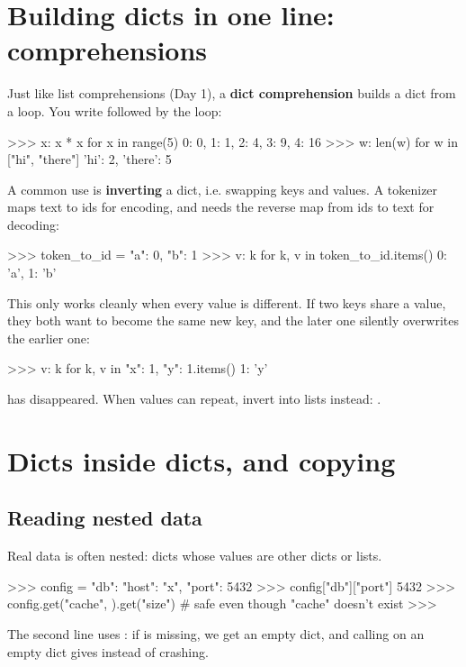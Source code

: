 \documentclass[10pt,a4paper]{article}
\begin{document}
\section{Building dicts in one line: comprehensions}
Just like list comprehensions (Day 1), a \textbf{dict comprehension} builds a dict from a loop. You write  followed by the loop:
\begin{txtcode}
>>> {x: x * x for x in range(5)}
{0: 0, 1: 1, 2: 4, 3: 9, 4: 16}
>>> {w: len(w) for w in ["hi", "there"]}
{'hi': 2, 'there': 5}
\end{txtcode}
A common use is \textbf{inverting} a dict, i.e. swapping keys and values. A tokenizer maps text to ids for encoding, and needs the reverse map from ids to text for decoding:
\begin{txtcode}
>>> token_to_id = {"a": 0, "b": 1}
>>> {v: k for k, v in token_to_id.items()}
{0: 'a', 1: 'b'}
\end{txtcode}
This only works cleanly when every value is different. If two keys share a value, they both want to become the same new key, and the later one silently overwrites the earlier one:
\begin{txtcode}
>>> {v: k for k, v in {"x": 1, "y": 1}.items()}
{1: 'y'}
\end{txtcode}
 has disappeared. When values can repeat, invert into lists instead: .
\setcounter{section}{6}
\section{Dicts inside dicts, and copying}
\subsection{Reading nested data}
Real data is often nested: dicts whose values are other dicts or lists.
\begin{txtcode}
>>> config = {"db": {"host": "x", "port": 5432}}
>>> config["db"]["port"]
5432
>>> config.get("cache", {}).get("size")    # safe even though "cache" doesn't exist
>>>
\end{txtcode}
The second line uses : if  is missing, we get an empty dict, and calling  on an empty dict gives  instead of crashing.
\end{document}
